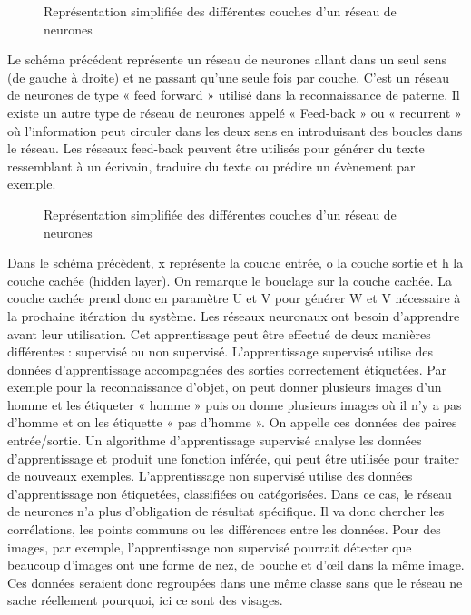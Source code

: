 \documentclass[debug,nodate,hideweeklyreports]{polytech/polytech}
\begin{document}
\begin{figure}
  \caption{Représentation simplifiée des différentes couches d'un réseau de neurones}
  \label{fig:layerssimpl}
\end{figure}

Le schéma précédent représente un réseau de neurones allant dans un seul sens (de gauche à droite) et ne passant qu’une seule fois par couche. C’est un réseau de neurones de type « feed forward » utilisé dans la reconnaissance de paterne. Il existe un autre type de réseau de neurones appelé « Feed-back » ou « recurrent » où l’information peut circuler dans les deux sens en introduisant des boucles dans le réseau. Les réseaux feed-back peuvent être utilisés pour générer du texte ressemblant à un écrivain, traduire du texte ou prédire un évènement par exemple. 

\begin{figure}
  \caption{Représentation simplifiée des différentes couches d'un réseau de neurones}
  \label{fig:layerscomp}
\end{figure}

Dans le schéma précèdent, x représente la couche entrée, o la couche sortie et h la couche cachée (hidden layer). On remarque le bouclage sur la couche cachée. La couche cachée prend donc en paramètre U et V pour générer W et V nécessaire à la prochaine itération du système.
Les réseaux neuronaux ont besoin d’apprendre avant leur utilisation.  Cet apprentissage peut être effectué de deux manières différentes : supervisé ou non supervisé. 
L’apprentissage supervisé utilise des données d’apprentissage accompagnées des sorties correctement étiquetées. Par exemple pour la reconnaissance d’objet, on peut donner plusieurs images d’un homme et les étiqueter « homme » puis on donne plusieurs images où il n’y a pas d’homme et on les étiquette « pas d’homme ». On appelle ces données des paires entrée/sortie. Un algorithme d'apprentissage supervisé analyse les données d'apprentissage et produit une fonction inférée, qui peut être utilisée pour traiter de nouveaux exemples.
L’apprentissage non supervisé utilise des données d’apprentissage non étiquetées, classifiées ou catégorisées. Dans ce cas, le réseau de neurones n’a plus d’obligation de résultat spécifique. Il va donc chercher les corrélations, les points communs ou les différences entre les données. Pour des images, par exemple, l’apprentissage non supervisé pourrait détecter que beaucoup d’images ont une forme de nez, de bouche et d’œil dans la même image. Ces données seraient donc regroupées dans une même classe sans que le réseau ne sache réellement pourquoi, ici ce sont des visages.
\end{document}
